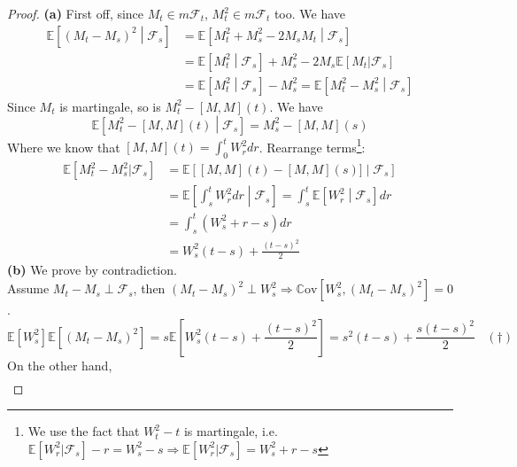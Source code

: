 \documentclass[a4paper, 10pt]{article}
\theoremstyle{definition}
\theoremstyle{hSol}
\begin{document}
\begin{proof} \textbf{(a)} First off, since $M_t \in m \mathcal{F}_t$, $M_t^2 \in m \mathcal{F}_t$ too. We have
\begin{equation}
	\begin{split}
		\mathbb{E}\left[(M_t-M_s)^2\middle|\mathcal{F}_s\right] &= \mathbb{E}\left[M_t^2 + M_s^2 - 2M_sM_t\middle|\mathcal{F}_s\right] \\
		&= \mathbb{E}\left[M_t^2\middle|\mathcal{F}_s\right] +M_s^2- 2M_s \mathbb{E}\left[M_t|\mathcal{F}_s\right]\\
		&= \mathbb{E}\left[M_t^2\middle|\mathcal{F}_s\right] -M_s^2 = \mathbb{E}\left[M_t^2 - M_s^2\middle|\mathcal{F}_s\right]
	\end{split}
\end{equation}
Since $M_t$ is martingale, so is $M_t^2 - [M,M](t)$. We have
\begin{equation}
	\mathbb{E}\left[M_t^2 - [M,M](t)\middle|\mathcal{F}_s\right] = M_s^2 - [M,M](s)
\end{equation}
Where we know that $[M,M](t)=\int_0^t W_r^2 dr$. Rearrange terms\footnote{We use the fact that $W_t^2 - t$ is martingale, i.e. $\mathbb{E}\left[W_r^2|\mathcal{F}_s\right] -r = W_s^2-s \Rightarrow \mathbb{E}\left[W_r^2|\mathcal{F}_s\right] = W_s^2 + r-s$}:
\begin{equation}
	\begin{split}
		\mathbb{E}\left[M_t^2-M_s^2|\mathcal{F}_s\right] &= \mathbb{E}\left[[M,M](t)-[M,M](s)]\middle|\mathcal{F}_s\right] \\
		&= \mathbb{E}\left[\int_s^t W_r^2 dr\middle|\mathcal{F}_s\right]=\int_s^t \mathbb{E}\left[W_r^2\middle|\mathcal{F}_s\right] dr\\
		&=\int_s^t (W_s^2 + r-s) dr \\
		&= W_s^2(t-s) + \frac{(t-s)^2}{2}
	\end{split}
\end{equation}
\textbf{(b)} We prove by contradiction. \\
Assume $M_t-M_s \perp \mathcal{F}_s$, then $(M_t-M_s)^2 \perp W_s^2 \Rightarrow \mathrm{\mathbb{C}ov}\left[W_s^2, (M_t-M_s)^2\right] = 0$. 
\begin{equation}
	\mathbb{E}\left[W_s^2\right]\mathbb{E}\left[(M_t-M_s)^2\right] = s \mathbb{E}\left[W_s^2(t-s) + \frac{(t-s)^2}{2}\right] = s^2(t-s)+\frac{s(t-s)^2}{2}~~~~(\dag)
\end{equation}
On the other hand,
\begin{equation}
	\begin{split}

\end{split}
\end{equation}
\end{proof}
\end{document}
